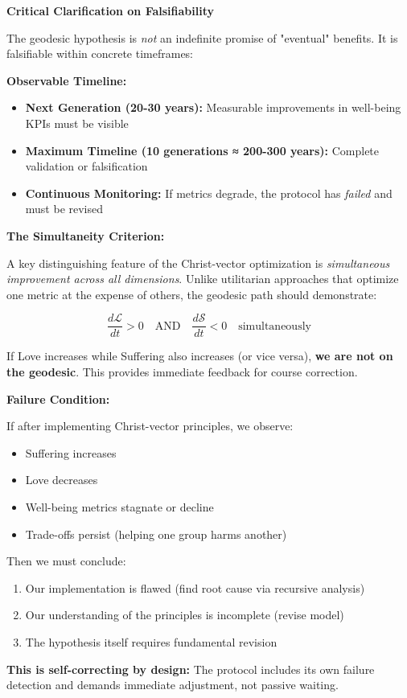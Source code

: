 \documentclass[11pt,a4paper]{article}
\theoremstyle{definition}
\theoremstyle{remark}
\begin{document}
\begin{mdframed}[backgroundcolor=yellow!10]
\textbf{Critical Clarification on Falsifiability}

The geodesic hypothesis is \textit{not} an indefinite promise of "eventual" benefits. It is falsifiable within concrete timeframes:

\textbf{Observable Timeline:}
\begin{itemize}
\item \textbf{Next Generation (20-30 years):} Measurable improvements in well-being KPIs must be visible
\item \textbf{Maximum Timeline (10 generations ≈ 200-300 years):} Complete validation or falsification
\item \textbf{Continuous Monitoring:} If metrics degrade, the protocol has \textit{failed} and must be revised
\end{itemize}

\textbf{The Simultaneity Criterion:}

A key distinguishing feature of the Christ-vector optimization is \textit{simultaneous improvement across all dimensions}. Unlike utilitarian approaches that optimize one metric at the expense of others, the geodesic path should demonstrate:

\begin{equation}
\frac{d\mathcal{L}}{dt} > 0 \quad \text{AND} \quad \frac{d\mathcal{S}}{dt} < 0 \quad \text{simultaneously}
\end{equation}

If Love increases while Suffering also increases (or vice versa), \textbf{we are not on the geodesic}. This provides immediate feedback for course correction.

\textbf{Failure Condition:}

If after implementing Christ-vector principles, we observe:
\begin{itemize}
\item Suffering increases
\item Love decreases  
\item Well-being metrics stagnate or decline
\item Trade-offs persist (helping one group harms another)
\end{itemize}

Then we must conclude:
\begin{enumerate}
\item Our implementation is flawed (find root cause via recursive analysis)
\item Our understanding of the principles is incomplete (revise model)
\item The hypothesis itself requires fundamental revision
\end{enumerate}

\textbf{This is self-correcting by design:} The protocol includes its own failure detection and demands immediate adjustment, not passive waiting.
\end{mdframed}
\end{document}
